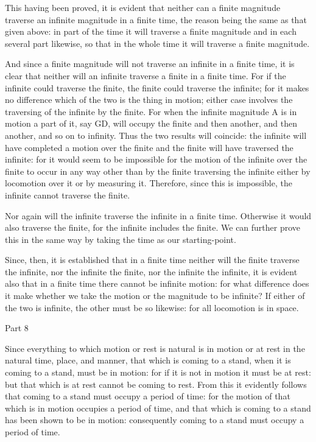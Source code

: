 This having been proved, it is evident that neither can a finite magnitude
traverse an infinite magnitude in a finite time, the reason being
the same as that given above: in part of the time it will traverse
a finite magnitude and in each several part likewise, so that in the
whole time it will traverse a finite magnitude. 

And since a finite magnitude will not traverse an infinite in a finite
time, it is clear that neither will an infinite traverse a finite
in a finite time. For if the infinite could traverse the finite, the
finite could traverse the infinite; for it makes no difference which
of the two is the thing in motion; either case involves the traversing
of the infinite by the finite. For when the infinite magnitude A is
in motion a part of it, say GD, will occupy the finite and then another,
and then another, and so on to infinity. Thus the two results will
coincide: the infinite will have completed a motion over the finite
and the finite will have traversed the infinite: for it would seem
to be impossible for the motion of the infinite over the finite to
occur in any way other than by the finite traversing the infinite
either by locomotion over it or by measuring it. Therefore, since
this is impossible, the infinite cannot traverse the finite.

Nor again will the infinite traverse the infinite in a finite time.
Otherwise it would also traverse the finite, for the infinite includes
the finite. We can further prove this in the same way by taking the
time as our starting-point. 

Since, then, it is established that in a finite time neither will
the finite traverse the infinite, nor the infinite the finite, nor
the infinite the infinite, it is evident also that in a finite time
there cannot be infinite motion: for what difference does it make
whether we take the motion or the magnitude to be infinite? If either
of the two is infinite, the other must be so likewise: for all locomotion
is in space. 

Part 8

Since everything to which motion or rest is natural is in motion or
at rest in the natural time, place, and manner, that which is coming
to a stand, when it is coming to a stand, must be in motion: for if
it is not in motion it must be at rest: but that which is at rest
cannot be coming to rest. From this it evidently follows that coming
to a stand must occupy a period of time: for the motion of that which
is in motion occupies a period of time, and that which is coming to
a stand has been shown to be in motion: consequently coming to a stand
must occupy a period of time. 

